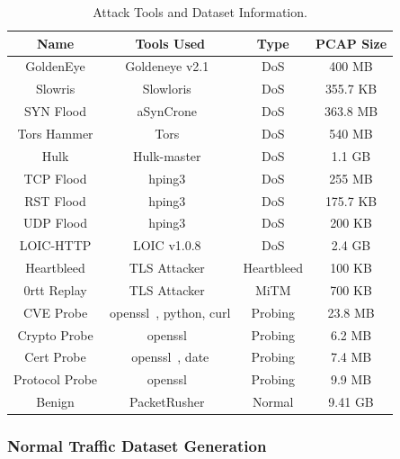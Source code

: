 \documentclass[journal,article,submit,moreauthors,pdftex]{Definitions/tsp}
\begin{document}
\begin{table}[H]
 \tablesize{\footnotesize}
\caption{Attack Tools and Dataset Information.}
\label{table:ddos_tools}
\begin{tabularx}{\textwidth}{CCCC}
\toprule
\textbf{Name}	&\textbf{Tools Used}	&\textbf{Type}	&\textbf{PCAP Size}\\
\midrule
GoldenEye & Goldeneye v2.1~\cite{GoldeneyeKaliLinux}& DoS & 400 MB \\
Slowris & Slowloris~\cite{andreYoloFTWPyLoris2022} & DoS & 355.7 KB \\
SYN Flood & aSynCrone~\cite{ovuncEmreOvuncPythonSYNFloodAttackTool2025} & DoS & 363.8 MB \\
Tors Hammer & Tors~\cite{karlKarlheinzniebuhrTorshammer2025} & DoS & 540 MB \\
Hulk & Hulk-master~\cite{i.grafovGrafovHulk2025} & DoS & 1.1 GB \\
TCP Flood & hping3~\cite{Hping3KaliLinux} & DoS & 255 MB \\
RST Flood & hping3~\cite{Hping3KaliLinux} & DoS & 175.7 KB \\
UDP Flood & hping3~\cite{Hping3KaliLinux} & DoS & 200 KB \\
LOIC-HTTP & LOIC v1.0.8~\cite{oliveiraNewEraCrackerLOIC2025} & DoS & 2.4 GB \\
Heartbleed & TLS Attacker~\cite{somorovskySystematicFuzzingTesting2016} & Heartbleed & 100 KB \\
0rtt Replay & TLS Attacker~\cite{somorovskySystematicFuzzingTesting2016} & MiTM & 700 KB \\
CVE Probe & openssl~\cite{OpensslOpenssl2025}, python, curl & Probing & 23.8 MB \\
Crypto Probe & openssl~\cite{OpensslOpenssl2025} & Probing & 6.2 MB \\
Cert Probe & openssl~\cite{OpensslOpenssl2025}, date & Probing & 7.4 MB \\
Protocol Probe & openssl~\cite{OpensslOpenssl2025} & Probing & 9.9 MB \\
Benign & PacketRusher~\cite{demmanuelePacketRusherHighPerformance2023} & Normal & 9.41 GB \\
\bottomrule
\end{tabularx}
\label{tab:attacks}
\end{table}

\subsubsection{Normal Traffic Dataset Generation}
\end{document}
